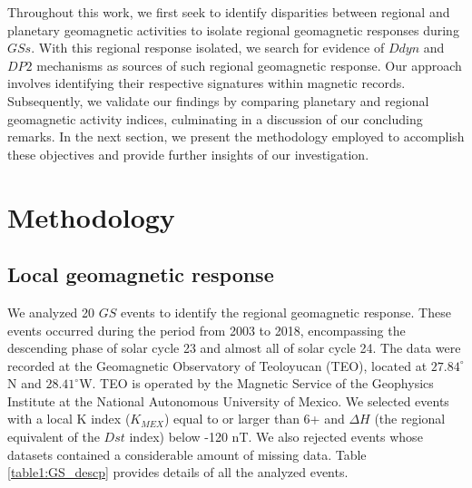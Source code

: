 \documentclass[a4paper,fleqn]{cas-dc}
\begin{document}
Throughout this work, we first seek to identify disparities between regional and planetary geomagnetic activities to isolate regional geomagnetic responses during $GSs$. With this regional response isolated, we search for evidence of $Ddyn$ and $DP2$ mechanisms as sources of such regional geomagnetic response. Our approach involves identifying their respective signatures within magnetic records. Subsequently, we validate our findings by comparing planetary and regional geomagnetic activity indices, culminating in a discussion of our concluding remarks. In the next section, we present the methodology employed to accomplish these objectives and provide further insights of our investigation.

\section{Methodology}
\label{Methodology}

\subsection{Local geomagnetic response}
\label{local response}

We analyzed 20 $GS$ events to identify the regional geomagnetic response. These events occurred during the period from 2003 to 2018, encompassing the descending phase of solar cycle 23 and almost all of solar cycle 24. The data were recorded at the Geomagnetic Observatory of Teoloyucan (TEO), located at $27.84^\circ$N and $28.41^\circ$W. TEO is operated by the Magnetic Service of the Geophysics Institute at the National Autonomous University of Mexico. We selected events with a local K index ($K_{MEX}$) equal to or larger than 6+ and $\Delta {H}$ (the regional equivalent of the ${Dst}$ index) below -120 nT. We also rejected events whose datasets contained a considerable amount of missing data. Table \ref{table1:GS_descp} provides details of all the analyzed events.
\end{document}
